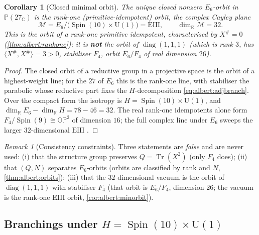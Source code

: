 \documentclass[11pt]{article}
\theoremstyle{plain}
\newtheorem{corollary}[theorem]{Corollary}
\theoremstyle{definition}
\theoremstyle{remark}
\newtheorem{remark}[theorem]{Remark}
\begin{document}
\begin{corollary}[Closed minimal orbit]\label{cor:albert:minorbit}
The unique closed nonzero $E_{6}$-orbit in $\mathbb{P}(27_{\mathbb{C}})$
is the rank-one (primitive-idempotent) orbit, the \emph{complex Cayley
plane}
\begin{equation}\label{eq:albert:EIII}
  \mathcal{M}
  = E_{6}/\bigl(\operatorname{Spin}(10)\times\mathrm{U}(1)\bigr)
  = \mathrm{EIII},
  \qquad
  \dim_{\mathbb{R}}\mathcal{M}=32 .
\end{equation}
This is the orbit of a rank-one primitive idempotent, characterised by
$X^{\#}=0$ (\autoref{thm:albert:rankone}); it is \textbf{not} the orbit
of $\operatorname{diag}(1,1,1)$ (which is rank $3$, has
$\langle X^{\#},X^{\#}\rangle=3>0$, stabiliser $F_{4}$, orbit $E_{6}/F_{4}$
of real dimension $26$).
\end{corollary}

\begin{proof}
The closed orbit of a reductive group in a projective space is the orbit
of a highest-weight line; for the $27$ of $E_{6}$ this is the rank-one
line, with stabiliser the parabolic whose reductive part fixes the
$H$-decomposition \eqref{eq:albert:adjbranch}. Over the compact form the
isotropy is $H=\operatorname{Spin}(10)\times\mathrm{U}(1)$, and
$\dim_{\mathbb{R}}E_{6}-\dim_{\mathbb{R}}H=78-46=32$. The real rank-one
idempotents alone form $F_{4}/\operatorname{Spin}(9)\cong
\mathbb{OP}^{2}$ of dimension $16$; the full complex line under $E_{6}$
sweeps the larger $32$-dimensional $\mathrm{EIII}$
\cite{Helgason:1978,Springer:2000}.
\end{proof}

\begin{remark}[Consistency constraints]\label{rmk:albert:forbidden}
Three statements are \emph{false} and are never used:
(i) that the structure group preserves $Q=\operatorname{Tr}(X^{2})$
(only $F_{4}$ does);
(ii) that $(Q,N)$ separates $E_{6}$-orbits (orbits are classified by rank
and $N$, \autoref{thm:albert:orbits});
(iii) that the $32$-dimensional vacuum is the orbit of
$\operatorname{diag}(1,1,1)$ with stabiliser $F_{4}$ (that orbit is
$E_{6}/F_{4}$, dimension $26$; the vacuum is the rank-one EIII orbit,
\autoref{cor:albert:minorbit}).
\end{remark}

\subsection{Branchings under \texorpdfstring{$H=\operatorname{Spin}(10)\times\mathrm{U}(1)$}{H = Spin(10) x U(1)}}
\label{sec:albert:branchings}
\end{document}
